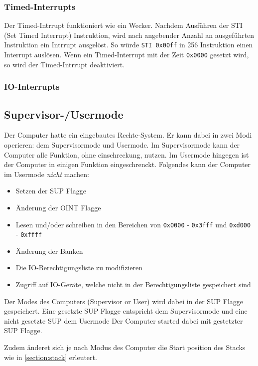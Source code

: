 \documentclass{scrartcl}
\begin{document}
\subsubsection{Timed-Interrupts}

Der Timed-Intrrupt funktioniert wie ein Wecker. Nachdem Ausführen der STI (Set Timed Interrupt) Instruktion, wird nach angebender Anzahl an ausgeführten Instruktion ein Intrrupt ausgelöst. So 
würde \texttt{STI 0x00ff} in 256 Instruktion einen Interrupt auslösen. Wenn ein Timed-Interrupt mit der Zeit \texttt{0x0000} gesetzt wird, so wird der Timed-Intrrupt deaktiviert.

\subsubsection{IO-Interrupts}

\subsection{\label{section:supervisor}Supervisor-/Usermode}

Der Computer hatte ein eingebautes Rechte-System. Er kann dabei in zwei Modi operieren: dem Supervisormode und Usermode. Im Supervisormode kann der Computer alle Funktion, ohne einschreckung, nutzen. Im Usermode hingegen ist der Computer in einigen Funktion eingeschrenckt. Folgendes kann der Computer im Usermode \emph{nicht} machen:

\begin{itemize}
	\item Setzen der SUP Flagge
	\item Änderung der OINT Flagge
	\item Lesen und/oder schreiben in den Bereichen von \texttt{0x0000} - \texttt{0x3fff} und \texttt{0xd000} - \texttt{0xffff}
	\item Änderung der Banken
	\item Die IO-Berechtigungsliste zu modifizieren
	\item Zugriff auf IO-Geräte, welche nicht in der Berechtigungsliste gespeichert sind
\end{itemize}

Der Modes des Computers (Supervisor or User) wird dabei in der SUP Flagge gespeichert. Eine gesetzte SUP Flagge entspricht dem Supervisormode und eine nicht gesetzte SUP dem Usermode Der Computer started dabei mit gestetzter SUP Flagge.

Zudem änderet sich je nach Modus des Computer die Start position des Stacks wie in \autoref{section:stack} erleutert.
\end{document}
